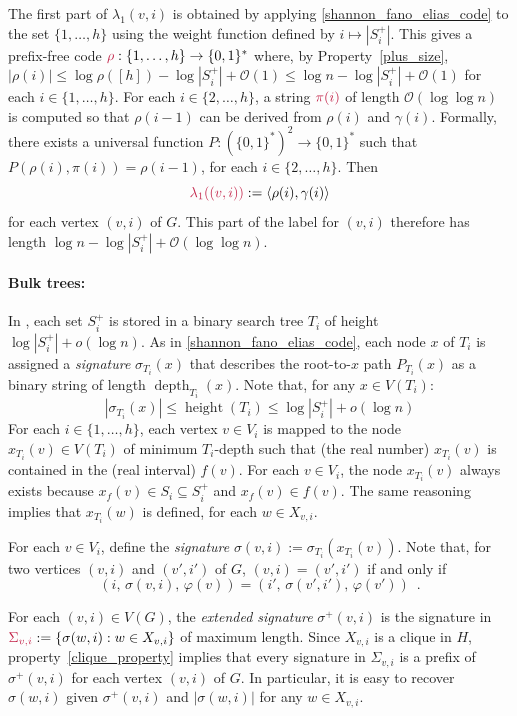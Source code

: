 \documentclass{patmorin}
\makeatletter
\renewcommand{\le}{\leqslant}
\newcommand{\defin}[1]{\emph{\textcolor{brightmaroon}{#1}}}
\def\mathcolor#1#{\@mathcolor{#1}}
\def\@mathcolor#1#2#3{%
  \protect\leavevmode
  \begingroup
    \color#1{#2}#3%
  \endgroup
}
\newcommand{\mathdefin}[1]{\mathcolor{brightmaroon}{#1}}
\DeclareMathOperator{\height}{height}
\DeclareMathOperator{\depth}{depth}
\newcommand{\Oh}{\mathcal{O}}
\makeatother
\begin{document}
  The first part of $\lambda_1(v,i)$ is obtained by applying \cref{shannon_fano_elias_code} to the set $\{1,\ldots,h\}$ using the weight function defined by $i \mapsto |S^+_i|$. This gives a prefix-free code $\mathdefin{\rho}:\{1,\ldots,h\}\to\{0,1\}^*$ where, by Property~\ref{plus_size}, $|\rho(i)|\le \log\rho([h]) - \log|S^+_i| + \Oh(1)\le \log n - \log|S^+_i| + \Oh(1)$ for each $i\in\{1,\ldots,h\}$.
  For each $i\in\{2,\ldots,h\}$, a string $\mathdefin{\pi(i)}$ of length $\Oh(\log\log n)$ is computed so that $\rho(i-1)$ can be derived from $\rho(i)$ and $\gamma(i)$.  Formally, there exists a universal function $P:(\{0,1\}^*)^2\to\{0,1\}^*$ such that $P(\rho(i),\pi(i))=\rho(i-1)$, for each $i\in\{2,\ldots,h\}$.
  Then
  \[
     \mathdefin{\lambda_1((v,i))}:=\langle \rho(i),\gamma(i)\rangle
  \]
  for each vertex $(v,i)$ of $G$.  This part of the label for $(v,i)$ therefore has length $\log n - \log |S^+_i| + \Oh(\log\log n)$.

  \paragraph{Bulk trees:}
  In \cite{dujmovic.esperet.ea:adjacency}, each set $S^+_i$ is stored in a binary search tree $T_i$ of height $\log|S^+_i|+o(\log n)$.
  As in \cref{shannon_fano_elias_code}, each node $x$ of $T_i$ is assigned a \defin{signature} \defin{$\sigma_{T_i}(x)$} that describes the root-to-$x$ path $P_{T_i}(x)$ as a binary string of length $\depth_{T_i}(x)$.
  Note that, for any $x\in V(T_i)$:
  \[
    |\sigma_{T_i}(x)| \le \height(T_i) \le \log|S^+_i|+o(\log n)
  \]
  For each $i\in\{1,\ldots,h\}$, each vertex $v\in V_i$ is mapped to the node $x_{T_i}(v)\in V(T_i)$ of minimum $T_i$-depth such that (the real number) $x_{T_i}(v)$ is contained in the (real interval) $f(v)$.
  For each $v\in V_i$, the node $x_{T_i}(v)$ always exists because $x_f(v)\in S_i\subseteq S_i^+$ and $x_f(v)\in f(v)$.  The same reasoning implies that $x_{T_i}(w)$ is defined, for each $w\in X_{v,i}$.



  For each $v\in V_i$, define the \defin{signature} $\sigma(v,i):=\sigma_{T_i}(x_{T_i}(v))$.  Note that, for two vertices $(v,i)$ and $(v',i')$ of $G$, $(v,i)=(v',i')$ if and only if
  \begin{equation}
     (i,\,\sigma(v,i),\,\varphi(v)) = (i',\,\sigma(v',i'),\,\varphi(v')) \enspace .
     \label{ps_identity}
  \end{equation}

  For each $(v,i)\in V(G)$, the \defin{extended signature} \defin{$\sigma^+(v,i)$} is the signature in $\mathdefin{\Sigma_{v,i}}:=\{\sigma(w,i):w\in X_{v,i}\}$ of maximum length.  Since $X_{v,i}$ is a clique in $H$, property~\ref{clique_property} implies that every signature in $\Sigma_{v,i}$ is a prefix of $\sigma^+(v,i)$ for each vertex $(v,i)$ of $G$.  In particular, it is easy to recover $\sigma(w,i)$ given $\sigma^+(v,i)$ and $|\sigma(w,i)|$ for any $w\in X_{v,i}$.
\end{document}
